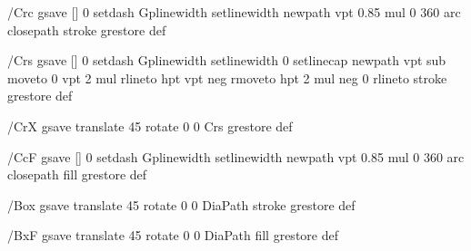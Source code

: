   /Crc  
  {  
    gsave  
      [] 0 setdash  
      Gplinewidth setlinewidth  
      newpath  
      vpt 0.85 mul 0 360 arc  
      closepath  
      stroke  
    grestore  
  } def  
        
    
  /Crs  
  {  
    gsave  
      [] 0 setdash  
      Gplinewidth setlinewidth  
      0 setlinecap  
      newpath  
      vpt sub  
      moveto  
      0 vpt 2 mul rlineto  
      hpt vpt neg rmoveto  
      hpt 2 mul neg 0 rlineto  
      stroke  
    grestore  
  } def  
    
  /CrX  
  {  
  gsave  
   translate  
   45 rotate  
   0 0 Crs  
  grestore  
  } def  
    
  /CcF  
  {  
    gsave  
      [] 0 setdash  
      Gplinewidth setlinewidth  
      newpath  
      vpt 0.85 mul 0 360 arc  
      closepath  
      fill  
    grestore  
  } def  
    
  /Box  
  {  
     gsave  
       translate  
       45 rotate  
       0 0 DiaPath  
       stroke  
     grestore  
  } def  
    
  /BxF  
  {  
     gsave  
       translate  
       45 rotate  
       0 0 DiaPath  
       fill  
     grestore  
  } def  
    
